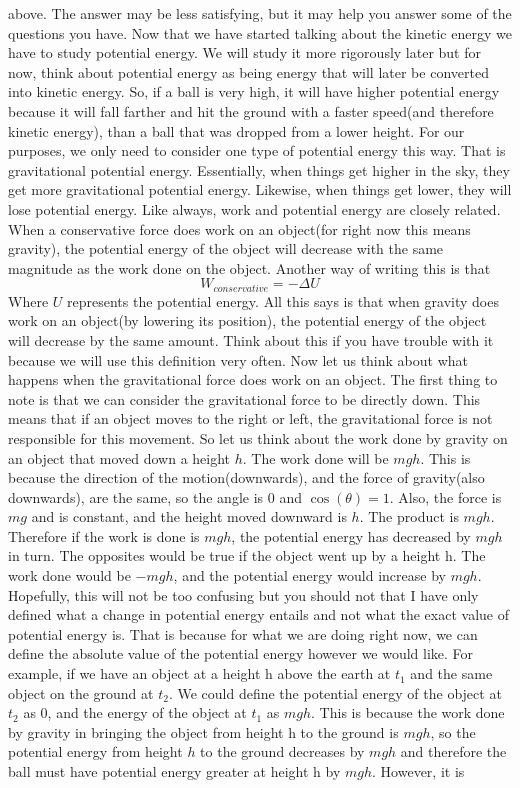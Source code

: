 above. The answer may be less satisfying, but it may help you answer some of the questions you have. Now that we have started talking about the kinetic energy we have to study potential energy. We will study it more rigorously later but for now, think about potential energy as being energy that will later be converted into kinetic energy. So, if a ball is very high, it will have higher potential energy because it will fall farther and hit the ground with a faster speed(and therefore kinetic energy), than a ball that was dropped from a lower height. For our purposes, we only need to consider one type of potential energy this way. That is gravitational potential energy. Essentially, when things get higher in the sky, they get more gravitational potential energy. Likewise, when things get lower, they will lose potential energy. Like always, work and potential energy are closely related. When a conservative force does work on an object(for right now this means gravity), the potential energy of the object will decrease with the same magnitude as the work done on the object. Another way of writing this is that \begin{equation}W_{conservative} = -\Delta U\end{equation} Where $U$ represents the potential energy. All this says is that when gravity does work on an object(by lowering its position), the potential energy of the object will decrease by the same amount. Think about this if you have trouble with it because we will use this definition very often. Now let us think about what happens when the gravitational force does work on an object. The first thing to note is that we can consider the gravitational force to be directly down. This means that if an object moves to the right or left, the gravitational force is not responsible for this movement. So let us think about the work done by gravity on an object that moved down a height $h$. The work done will be $mgh$. This is because the direction of the motion(downwards), and the force of gravity(also downwards), are the same, so the angle is 0 and $\cos\left(\theta \right)=1$. Also, the force is $mg$ and is constant, and the height moved downward is $h$. The product is $mgh$. Therefore if the work is done is $mgh$, the potential energy has decreased by $mgh$ in turn. The opposites would be true if the object went up by a height h. The work done would be $-mgh$, and the potential energy would increase by $mgh$. Hopefully, this will not be too confusing but you should not that I have only defined what a change in potential energy entails and not what the exact value of potential energy is. That is because for what we are doing right now, we can define the absolute value of the potential energy however we would like. For example, if we have an object at a height h above the earth at $t_1$ and the same object on the ground at $t_2$. We could define the potential energy of the object at $t_2$ as 0, and the energy of the object at $t_1$ as $mgh$. This is because the work done by gravity in bringing the object from height h to the ground is $mgh$, so the potential energy from height $h$ to the ground decreases by $mgh$ and therefore the ball must have potential energy greater at height h by $mgh$. However, it is 